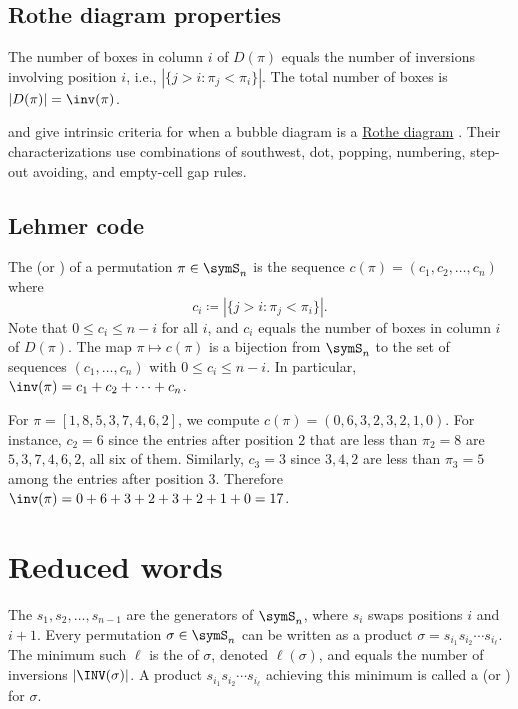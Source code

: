 \subsection[rotheDiagram]{Rothe diagram properties}

The number of boxes in column $i$ of $D(\pi)$ equals the number of inversions
involving position $i$,
i.e., $|\{j > i : \pi_j < \pi_i\}|$.
The total number of boxes is $|D(\pi)| = \inv(\pi)$.

 and  give intrinsic criteria for when
a bubble diagram is a \hyperref[rotheDiagram]{Rothe diagram}
\cite{GillenMichala2023x}.  Their characterizations use combinations of
southwest, dot, popping, numbering, step-out avoiding, and empty-cell gap
rules.


\subsection[lehmerCode]{Lehmer code}

The \label{lehmerCodeDefinition}
(or \label{inversionTableDefinition})
of a permutation $\pi \in \symS_n$ is the sequence
$c(\pi) = (c_1, c_2, \dotsc, c_n)$ where
\[
c_i \coloneqq |\{j > i : \pi_j < \pi_i\}|.
\]
Note that $0 \leq c_i \leq n-i$ for all $i$, and $c_i$ equals the number of
boxes in column $i$ of $D(\pi)$.
The map $\pi \mapsto c(\pi)$ is a bijection from $\symS_n$ to the set of
sequences $(c_1, \dotsc, c_n)$ with $0 \leq c_i \leq n - i$.
In particular, $\inv(\pi) = c_1 + c_2 + \dotsb + c_n$.

\begin{example*}
For $\pi = [1,8,5,3,7,4,6,2]$, we compute $c(\pi) = (0,6,3,2,3,2,1,0)$.
For instance, $c_2 = 6$ since the entries after position $2$ that are less
than $\pi_2 = 8$ are $5,3,7,4,6,2$, all six of them.
Similarly, $c_3 = 3$ since $3,4,2$ are less than $\pi_3 = 5$ among the entries after position $3$.
Therefore $\inv(\pi) = 0+6+3+2+3+2+1+0 = 17$.
\end{example*}


\section[reducedWord]{Reduced words}

The \label{simpleTranspositionDefinition}
$s_1, s_2, \dotsc, s_{n-1}$
are the generators of $\symS_n$, where $s_i$ swaps positions $i$ and $i+1$.
Every permutation $\sigma \in \symS_n$ can be written as a product
$\sigma = s_{i_1} s_{i_2} \dotsm s_{i_\ell}$.
The minimum such $\ell$ is the \label{permutationLengthDefinition}
of $\sigma$,
denoted $\ell(\sigma)$, and equals the number of inversions $|\INV(\sigma)|$.
A product $s_{i_1} s_{i_2} \dotsm s_{i_\ell}$ achieving this minimum
is called a \label{reducedWordDefinition}
(or \label{reducedExpressionDefinition}) for $\sigma$.


